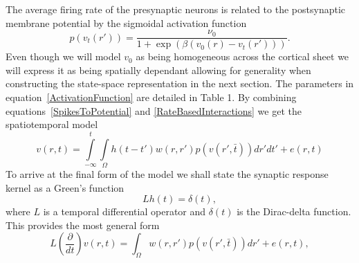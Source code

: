 \documentclass[onecolumn,draftcls]{IEEEtran}
\begin{document}
The average firing rate of the presynaptic neurons is related to the postsynaptic membrane potential by the sigmoidal activation function
\begin{equation}\label{ActivationFunction}
p\left( {{v_t}\left( {r'} \right)} \right) = \frac{{{\nu _0}}}{{1 + \exp \left( {\beta \left( {{v_0}\left( r \right) - {v_t}\left( {r'} \right)} \right)} \right)}}.
\end{equation}
Even though we will model  $v_0$ as being homogeneous across the cortical sheet we will express it as being spatially dependant allowing for generality when constructing the state-space representation in the next section. The parameters in equation~\ref{ActivationFunction} are detailed in Table 1. By combining equations~\ref{SpikesToPotential} and \ref{RateBasedInteractions} we get the spatiotemporal model
\begin{equation}\label{FullDoubleIntModel}
v\left(r,t\right) = \int\limits_{-\infty}^t\int\limits_\Omega  h\left(t - t'\right)w\left(r,r'\right)p\left( v\left( r',\bar t \right)\right)dr' dt'+e\left(r,t\right)
\end{equation}
To arrive at the final form of the model we shall state the synaptic response kernel as a Green's function
\begin{equation}\label{GreensFuncDef}
Lh\left( t \right) = \delta \left( t \right),
\end{equation}
where $L$ is a temporal differential operator and $\delta(t)$ is the Dirac-delta function. This provides the most general form
\begin{equation}\label{GenForm}
L\left( {\frac{\partial }{{dt}}} \right)v\left( {r,t} \right) = \int_\Omega  {w\left( {r,r'} \right)p\left( {v\left( {r',\bar t} \right)} \right)dr'}  + e\left( {r,t} \right),
\end{equation}
\end{document}
